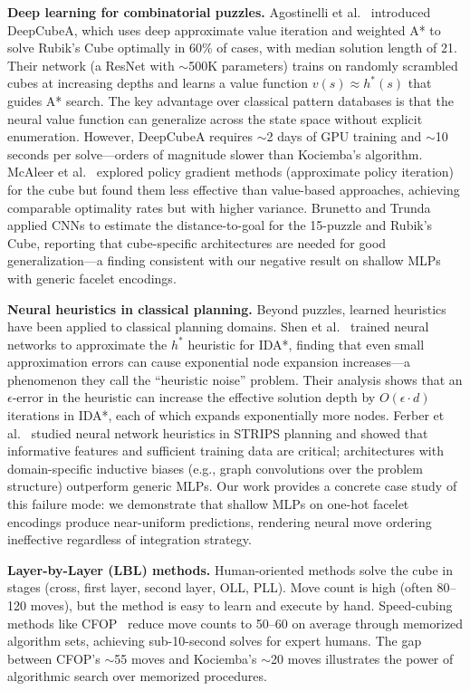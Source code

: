 \documentclass[10pt,twocolumn,a4paper]{article}
\begin{document}
\textbf{Deep learning for combinatorial puzzles.}
Agostinelli et al.~\cite{deepcubea} introduced DeepCubeA, which uses deep approximate value iteration and weighted A* to solve Rubik's Cube optimally in 60\% of cases, with median solution length of 21. Their network (a ResNet with $\sim$500K parameters) trains on randomly scrambled cubes at increasing depths and learns a value function $v(s) \approx h^*(s)$ that guides A* search. The key advantage over classical pattern databases is that the neural value function can generalize across the state space without explicit enumeration. However, DeepCubeA requires $\sim$2 days of GPU training and $\sim$10 seconds per solve---orders of magnitude slower than Kociemba's algorithm. McAleer et al.~\cite{mcaleer2018} explored policy gradient methods (approximate policy iteration) for the cube but found them less effective than value-based approaches, achieving comparable optimality rates but with higher variance. Brunetto and Trunda~\cite{brunetto2017} applied CNNs to estimate the distance-to-goal for the 15-puzzle and Rubik's Cube, reporting that cube-specific architectures are needed for good generalization---a finding consistent with our negative result on shallow MLPs with generic facelet encodings.

\textbf{Neural heuristics in classical planning.}
Beyond puzzles, learned heuristics have been applied to classical planning domains. Shen et al.~\cite{shen2020} trained neural networks to approximate the $h^*$ heuristic for IDA*, finding that even small approximation errors can cause exponential node expansion increases---a phenomenon they call the ``heuristic noise'' problem. Their analysis shows that an $\epsilon$-error in the heuristic can increase the effective solution depth by $O(\epsilon \cdot d)$ iterations in IDA*, each of which expands exponentially more nodes. Ferber et al.~\cite{ferber2022} studied neural network heuristics in STRIPS planning and showed that informative features and sufficient training data are critical; architectures with domain-specific inductive biases (e.g., graph convolutions over the problem structure) outperform generic MLPs. Our work provides a concrete case study of this failure mode: we demonstrate that shallow MLPs on one-hot facelet encodings produce near-uniform predictions, rendering neural move ordering ineffective regardless of integration strategy.

\textbf{Layer-by-Layer (LBL) methods.}
Human-oriented methods solve the cube in stages (cross, first layer, second layer, OLL, PLL). Move count is high (often 80--120 moves), but the method is easy to learn and execute by hand. Speed-cubing methods like CFOP~\cite{fridrich} reduce move counts to 50--60 on average through memorized algorithm sets, achieving sub-10-second solves for expert humans. The gap between CFOP's $\sim$55 moves and Kociemba's $\sim$20 moves illustrates the power of algorithmic search over memorized procedures.
\end{document}
